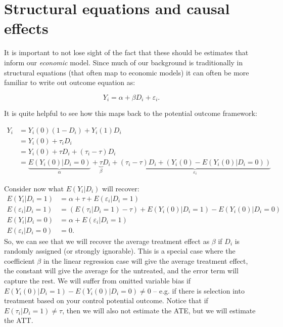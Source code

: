 \documentclass{tufte-handout}
\theoremstyle{break}
\begin{document}
\section{Structural equations and causal effects}
It is important to not lose sight of the fact that these should be estimates that inform our \emph{economic} model. Since much of our background is traditionally in structural equations (that often map to economic models) it can often be more familiar to write out outcome equation as:

\begin{equation*}
  Y_{i} = \alpha + \beta D_{i} + \varepsilon_{i}.
\end{equation*}

It is quite helpful to see how this maps back to the potential outcome framework:

\begin{align*}
  Y_{i} &= Y_{i}(0)(1 - D_{i}) + Y_{i}(1)D_{i}\\
  &= Y_{i}(0) + \tau_{i}D_{i}\\
  &= Y_{i}(0) + \tau D_{i} + (\tau_{i} - \tau)D_{i}\\
  &= \underbrace{E(Y_{i}(0) | D_{i} = 0)}_{\alpha} + \underbrace{\tau}_{\beta} D_{i} + \underbrace{(\tau_{i} - \tau)D_{i} + (Y_{i}(0)-E(Y_{i}(0) | D_{i} = 0))}_{\varepsilon_{i}}
\end{align*}

Consider now what $E(Y_{i} | D_{i})$ will recover:
\begin{align*}
  E(Y_{i} | D_{i} = 1) &= \alpha + \tau + E(\varepsilon_{i} | D_{i} = 1)\\
  E(\varepsilon_{i} | D_{i} = 1) &= (E(\tau_{i} | D_{i}=1) - \tau)  + E(Y_{i}(0) | D_{i} = 1) -  E(Y_{i}(0) | D_{i} = 0)\\
  E(Y_{i} | D_{i} = 0) &= \alpha + E(\varepsilon_{i} | D_{i} = 1)\\
  E(\varepsilon_{i} | D_{i} = 0) &= 0.
\end{align*}
So, we can see that we will recover the average treatment effect as $\beta$ if $D_{i}$ is randomly assigned (or strongly ignorable).  This is a special case where the coefficient $\beta$ in the linear regression case will give the average treatment effect, the constant will give the average for the untreated, and the error term will capture the rest. We will suffer from omitted variable bias if $ E(Y_{i}(0) | D_{i} = 1) -  E(Y_{i}(0) | D_{i} = 0) \neq 0$ -- e.g. if there is selection into treatment based on your control potential outcome. Notice that if $E(\tau_{i} | D_{i} =1) \not=\tau$, then we will also not estimate the ATE, but we will estimate the ATT.
\end{document}
